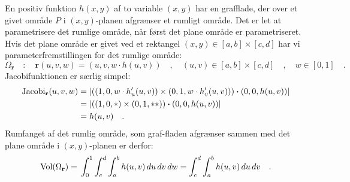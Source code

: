 \begin{example}\label{exampGraffladeVol}
En positiv funktion $h(x,y)$ af to variable $(x,y)$ har en grafflade, der over et givet område $P$ i $(x,y)$-planen
afgrænser et rumligt område. Det er let at parametrisere det rumlige område, når først det plane område er parametriseret.\\

Hvis det plane område er givet ved et rektangel $(x,y) \in [a,b]\times[c, d]$ har vi parameterfremstillingen for det rumlige område:
\begin{equation}
\Omega_{\mathbf{r}} \quad : \quad \mathbf{r}(u,v,w) = (u, v, w\cdot h(u,v)) \quad , \quad (u,v) \in [a,b]\times[c, d] \quad , \quad w \in [0, 1]\quad .
\end{equation}
Jacobifunktionen er særlig simpel:
\begin{equation}
\begin{aligned}
\operatorname{Jacobi}_{\mathbf{r}}(u,v,w) &= | ((1,0, w\cdot h'_{u}(u,v)) \times (0,1, w\cdot h'_{v}(u,v))) \bm{\cdot} (0,0,h(u,v)) | \\
& = | ((1,0, *) \times (0,1, **)) \bm{\cdot} (0,0,h(u,v)) |  \\
&= h(u,v) \quad.
\end{aligned}
\end{equation}
Rumfanget af det rumlig område, som graf-fladen afgrænser sammen med det plane område i $(x,y)$-planen er derfor:
\begin{equation}
\operatorname{Vol}(\Omega_{\mathbf{r}}) =
\, \int_{0}^{1}\int_{c}^{d} \int_{a}^{b} h(u,v) \,du
\, dv \, dw = \int_{c}^{d} \int_{a}^{b} h(u,v) \,du
\, dv \quad .
\end{equation}


\end{example}
